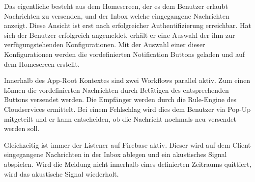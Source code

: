Das eigentliche \emph{} besteht aus dem Homescreen,
der es dem Benutzer erlaubt Nachrichten zu versenden, und der Inbox welche eingegangene Nachrichten anzeigt.
Diese Ansicht ist erst nach erfolgreicher Authentifizierung erreichbar.
Hat sich der Benutzer erfolgreich angemeldet, erhält er eine Auswahl der ihm zur verfügungstehenden Konfigurationen.
Mit der Auswahl einer dieser Konfigurationen werden die vordefinierten Notification Buttons geladen und auf dem Homescreen erstellt.

Innerhalb des App-Root Kontextes sind zwei Workflows parallel aktiv.
Zum einen können die vordefinierten Nachrichten durch Betätigen des entsprechenden Buttons versendet werden.
Die Empfänger werden durch die Rule-Engine des Cloudservices ermittelt.
Bei einem Fehlschlag wird dies dem Benutzer via Pop-Up mitgeteilt und er kann entscheiden, ob die Nachricht nochmals neu versendet werden soll.

Gleichzeitig ist immer der Listener auf Firebase aktiv.
Dieser wird auf dem Client eingegangene Nachrichten in der Inbox ablegen und ein akustisches Signal abspielen.
Wird die Meldung nicht innerhalb eines definierten Zeitraums quittiert, wird das akustische Signal wiederholt.
\clearpage

